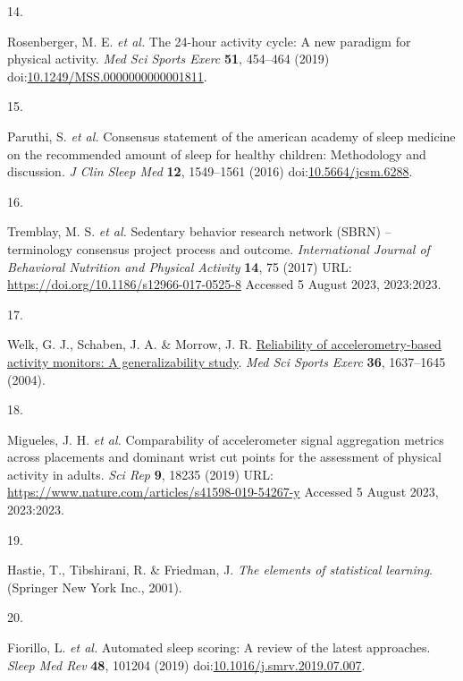 \documentclass[
  9pt,
]{article}
\newlength{\cslhangindent}
\newlength{\csllabelwidth}
\newlength{\cslentryspacingunit} %
\newenvironment{CSLReferences}[2] %
 {%
  \setlength{\parindent}{0pt}
  \ifodd #1
  \let\oldpar\par
  \def\par{\hangindent=\cslhangindent\oldpar}
  \fi
  \setlength{\parskip}{#2\cslentryspacingunit}
 }%
 {}
\newcommand{\CSLLeftMargin}[1]{\parbox[t]{\csllabelwidth}{#1}}
\newcommand{\CSLRightInline}[1]{\parbox[t]{\linewidth - \csllabelwidth}{#1}\break}
\begin{document}
\begin{CSLReferences}{0}{0}
\leavevmode{}%
\CSLLeftMargin{14. }%
\CSLRightInline{Rosenberger, M. E. \emph{et al.} The 24-hour activity
cycle: A new paradigm for physical activity. \emph{Med Sci Sports Exerc}
\textbf{51}, 454--464 (2019)
doi:\href{https://doi.org/10.1249/MSS.0000000000001811}{10.1249/MSS.0000000000001811}.}

\leavevmode{}%
\CSLLeftMargin{15. }%
\CSLRightInline{Paruthi, S. \emph{et al.} Consensus statement of the
american academy of sleep medicine on the recommended amount of sleep
for healthy children: Methodology and discussion. \emph{J Clin Sleep
Med} \textbf{12}, 1549--1561 (2016)
doi:\href{https://doi.org/10.5664/jcsm.6288}{10.5664/jcsm.6288}.}

\leavevmode{}%
\CSLLeftMargin{16. }%
\CSLRightInline{Tremblay, M. S. \emph{et al.} Sedentary behavior
research network ({SBRN}) -- terminology consensus project process and
outcome. \emph{International Journal of Behavioral Nutrition and
Physical Activity} \textbf{14}, 75 (2017) URL:
\url{https://doi.org/10.1186/s12966-017-0525-8} Accessed 5 August 2023,
2023:2023.}

\leavevmode{}%
\CSLLeftMargin{17. }%
\CSLRightInline{Welk, G. J., Schaben, J. A. \& Morrow, J. R.
\href{https://www.ncbi.nlm.nih.gov/pubmed/15354049}{Reliability of
accelerometry-based activity monitors: A generalizability study}.
\emph{Med Sci Sports Exerc} \textbf{36}, 1637--1645 (2004).}

\leavevmode{}%
\CSLLeftMargin{18. }%
\CSLRightInline{Migueles, J. H. \emph{et al.} Comparability of
accelerometer signal aggregation metrics across placements and dominant
wrist cut points for the assessment of physical activity in adults.
\emph{Sci Rep} \textbf{9}, 18235 (2019) URL:
\url{https://www.nature.com/articles/s41598-019-54267-y} Accessed 5
August 2023, 2023:2023.}

\leavevmode{}%
\CSLLeftMargin{19. }%
\CSLRightInline{Hastie, T., Tibshirani, R. \& Friedman, J. \emph{The
elements of statistical learning}. (Springer New York Inc., 2001).}

\leavevmode{}%
\CSLLeftMargin{20. }%
\CSLRightInline{Fiorillo, L. \emph{et al.} Automated sleep scoring: A
review of the latest approaches. \emph{Sleep Med Rev} \textbf{48},
101204 (2019)
doi:\href{https://doi.org/10.1016/j.smrv.2019.07.007}{10.1016/j.smrv.2019.07.007}.}


\end{CSLReferences}
\end{document}
